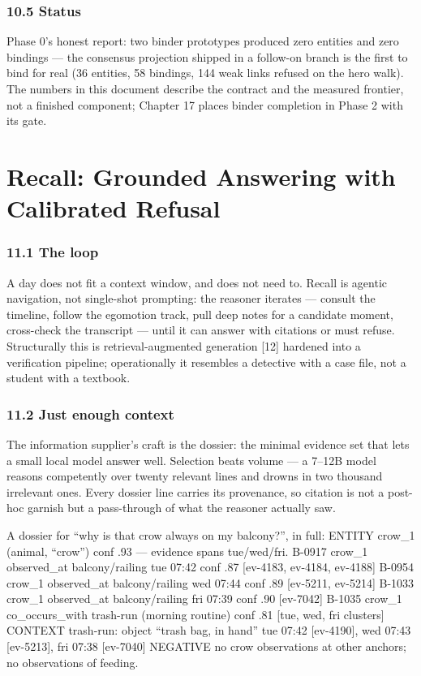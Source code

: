 \subsection{10.5 Status}\label{status}

Phase 0's honest report: two binder prototypes produced zero entities and zero bindings --- the consensus projection shipped in a follow-on branch is the first to bind for real (36 entities, 58 bindings, 144 weak links refused on the hero walk). The numbers in this document describe the contract and the measured frontier, not a finished component; Chapter 17 places binder completion in Phase 2 with its gate.

\chapter{Recall: Grounded Answering with Calibrated Refusal}\label{recall-grounded-answering-with-calibrated-refusal}

\subsection{11.1 The loop}\label{the-loop}

A day does not fit a context window, and does not need to. Recall is agentic navigation, not single-shot prompting: the reasoner iterates --- consult the timeline, follow the egomotion track, pull deep notes for a candidate moment, cross-check the transcript --- until it can answer with citations or must refuse. Structurally this is retrieval-augmented generation {[}12{]} hardened into a verification pipeline; operationally it resembles a detective with a case file, not a student with a textbook.

\subsection{11.2 Just enough context}\label{just-enough-context}

The information supplier's craft is the dossier: the minimal evidence set that lets a small local model answer well. Selection beats volume --- a 7--12B model reasons competently over twenty relevant lines and drowns in two thousand irrelevant ones. Every dossier line carries its provenance, so citation is not a post-hoc garnish but a pass-through of what the reasoner actually saw.

A dossier for ``why is that crow always on my balcony?'', in full: ENTITY crow\_1 (animal, ``crow'') conf .93 --- evidence spans tue/wed/fri. B-0917 crow\_1 observed\_at balcony/railing tue 07:42 conf .87 {[}ev-4183, ev-4184, ev-4188{]} B-0954 crow\_1 observed\_at balcony/railing wed 07:44 conf .89 {[}ev-5211, ev-5214{]} B-1033 crow\_1 observed\_at balcony/railing fri 07:39 conf .90 {[}ev-7042{]} B-1035 crow\_1 co\_occurs\_with trash-run (morning routine) conf .81 {[}tue, wed, fri clusters{]} CONTEXT trash-run: object ``trash bag, in hand'' tue 07:42 {[}ev-4190{]}, wed 07:43 {[}ev-5213{]}, fri 07:38 {[}ev-7040{]} NEGATIVE no crow observations at other anchors; no observations of feeding.


